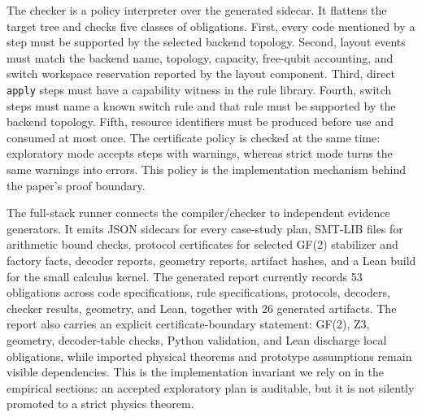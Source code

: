 The checker is a policy interpreter over the generated sidecar.
It flattens the target tree and checks five classes of obligations.
First, every code mentioned by a step must be supported by the selected backend topology.
Second, layout events must match the backend name, topology, capacity, free-qubit accounting, and switch workspace reservation reported by the layout component.
Third, direct \texttt{apply} steps must have a capability witness in the rule library.
Fourth, switch steps must name a known switch rule and that rule must be supported by the backend topology.
Fifth, resource identifiers must be produced before use and consumed at most once.
The certificate policy is checked at the same time: exploratory mode accepts \Assumed{} steps with warnings, whereas strict mode turns the same warnings into errors.
This policy is the implementation mechanism behind the paper's proof boundary.

The full-stack runner connects the compiler/checker to independent evidence generators.
It emits JSON sidecars for every case-study plan, SMT-LIB files for arithmetic bound checks, protocol certificates for selected GF(2) stabilizer and factory facts, decoder reports, geometry reports, artifact hashes, and a Lean build for the small calculus kernel.
The generated report currently records 53 obligations across code specifications, rule specifications, protocols, decoders, checker results, geometry, and Lean, together with 26 generated artifacts.
The report also carries an explicit certificate-boundary statement: GF(2), Z3, geometry, decoder-table checks, Python validation, and Lean discharge local obligations, while imported physical theorems and prototype assumptions remain visible dependencies.
This is the implementation invariant we rely on in the empirical sections: an accepted exploratory plan is auditable, but it is not silently promoted to a strict physics theorem.
